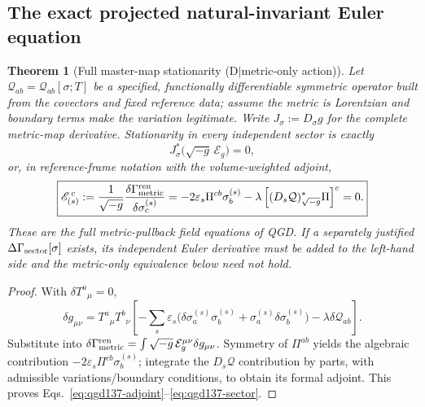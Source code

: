 \documentclass[11pt,a4paper]{article}
\newtheorem{theorem}{Theorem}[section]
\begin{document}
\subsection{The exact projected natural-invariant Euler equation}
\begin{theorem}[Full master-map stationarity (D$\mid$metric-only action)]
\label{thm:qgd137-projection}
Let $\mathcal Q_{ab}=\mathcal Q_{ab}[\sigma;T]$ be a specified,
functionally differentiable symmetric operator built from the
covectors and fixed reference data; assume the metric is Lorentzian
and boundary terms make the variation legitimate. Write
$J_\sigma:=D_\sigma g$ for the \emph{complete} metric-map derivative.
Stationarity in every independent sector is exactly
\begin{equation}\label{eq:qgd137-adjoint}
\boxed{J_\sigma^*\bigl(\sqrt{-g}\,\mathcal E_g\bigr)=0,}
\end{equation}
or, in reference-frame notation with the volume-weighted adjoint,
\begin{equation}\label{eq:qgd137-sector}
\boxed{\mathscr E_{(s)}^{\,c}:=\frac{1}{\sqrt{-g}}
\frac{\delta\Gamma_{\rm metric}^{\rm ren}}
{\delta\sigma_c^{(s)}}
=-2\varepsilon_s\Pi^{cb}\sigma_b^{(s)}
-\lambda\left[(D_s\mathcal Q)^*_{\sqrt{-g}}\Pi\right]^c=0.}
\end{equation}
These are the \emph{full metric-pullback field equations} of QGD.
If a separately justified $\Delta\Gamma_{\rm sector}[\sigma]$
exists, its independent Euler derivative must be added to the
left-hand side and the metric-only equivalence below need not hold.
\end{theorem}
\begin{proof}
With $\delta T^a{}_{\mu}=0$,
\begin{equation}\label{eq:qgd137-dg}
\delta g_{\mu\nu}=T^a{}_{\mu}T^b{}_{\nu}
\left[-\sum_s\varepsilon_s\bigl(
\delta\sigma_a^{(s)}\sigma_b^{(s)}+
\sigma_a^{(s)}\delta\sigma_b^{(s)}\bigr)
-\lambda\delta\mathcal Q_{ab}\right].
\end{equation}
Substitute into
$\delta\Gamma_{\rm metric}^{\rm ren}=\int\sqrt{-g}\,
\mathcal E_g^{\mu\nu}\delta g_{\mu\nu}$.
Symmetry of $\Pi^{ab}$ yields the algebraic contribution
$-2\varepsilon_s\Pi^{cb}\sigma_b^{(s)}$; integrate the
$D_s\mathcal Q$ contribution by parts, with admissible
variations/boundary conditions, to obtain its formal adjoint.
This proves Eqs.~\eqref{eq:qgd137-adjoint}--\eqref{eq:qgd137-sector}.
\end{proof}
\end{document}

